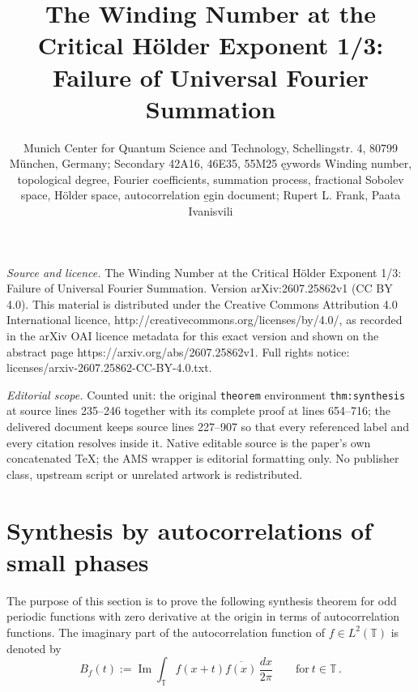 \documentclass[10pt,a4paper]{amsart}
\newcommand{\T}{\mathbb T}
\begin{document}
\title[The Winding Number at the Critical H"older Exponent 1/3: Fai]{The Winding Number at the Critical H\"older Exponent 1/3: Failure of Universal Fourier Summation}
\author{Munich Center for Quantum Science and Technology, Schellingstr. 4, 80799 München, Germany; Secondary 42A16, 46E35, 55M25 ęywords Winding number, topological degree, Fourier coefficients, summation process, fractional Sobolev space, Hölder space, autocorrelation e̱gin document; Rupert L. Frank, Paata Ivanisvili}
\date{}
\maketitle
\noindent\emph{Source and licence.} The Winding Number at the Critical H\"older Exponent 1/3: Failure of Universal Fourier Summation. Version arXiv:2607.25862v1 (CC BY 4.0). This material is distributed under the Creative Commons Attribution 4.0 International licence, http://creativecommons.org/licenses/by/4.0/, as recorded in the arXiv OAI licence metadata for this exact version and shown on the abstract page https://arxiv.org/abs/2607.25862v1. Full rights notice: licenses/arxiv-2607.25862-CC-BY-4.0.txt.\par\smallskip
\noindent\textit{Editorial scope.} Counted unit: the original \texttt{theorem} environment \texttt{thm:synthesis} at source lines 235--246 together with its complete proof at lines 654--716; the delivered document keeps source lines 227--907 so that every referenced label and every citation resolves inside it. Native editable source is the paper's own concatenated TeX; the AMS wrapper is editorial formatting only. No publisher class, upstream script or unrelated artwork is redistributed.
\section{Synthesis by autocorrelations of small phases}\label{sec:synthesis}

The purpose of this section is to prove the following synthesis theorem for odd periodic functions with zero derivative at the origin in terms of autocorrelation functions. The imaginary part of the autocorrelation function of $f\in L^2(\T)$ is denoted by
\begin{equation}
    \label{eq:imag-autocorrelation}
    B_f(t) :=\operatorname{Im}\int_\T f(x+t)\overline{f(x)}\,\frac{dx}{2\pi} \qquad\text{for}\ t\in\T \,.
\end{equation}
\end{document}
